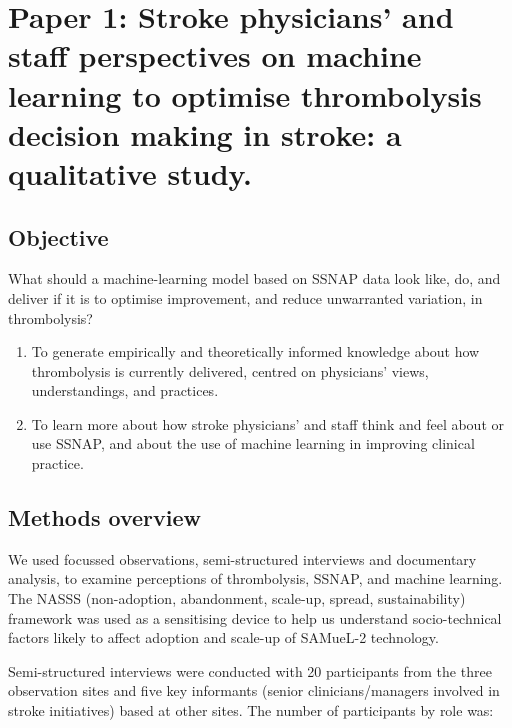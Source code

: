 \section{Paper 1: Stroke physicians' and staff perspectives on machine learning to optimise thrombolysis decision making in stroke: a qualitative study. \cite{jarvie_stroke_2024}}\label{sec:paper_1}

\subsection{Objective}

What should a machine-learning model based on SSNAP data look like, do, and deliver if it is to optimise improvement, and reduce unwarranted variation, in thrombolysis?

\begin{enumerate}
    \item To generate empirically and theoretically informed knowledge about how thrombolysis is currently delivered, centred on physicians’ views, understandings, and practices.
    \item To learn more about how stroke physicians’ and staff think and feel about or use SSNAP, and about the use of machine learning in improving clinical practice.
\end{enumerate}

\subsection{Methods overview}

We used focussed observations, semi-structured interviews and documentary analysis, to examine perceptions of thrombolysis, SSNAP, and machine learning. The NASSS (non-adoption, abandonment, scale-up, spread, sustainability) framework \cite{greenhalgh_beyond_2017} was used as a sensitising device to help us understand socio-technical factors likely to affect adoption and scale-up of SAMueL-2 technology.

Semi-structured interviews were conducted with 20 participants from the three observation sites and five key informants (senior clinicians/managers involved in stroke initiatives) based at other sites. The number of participants by role was:

